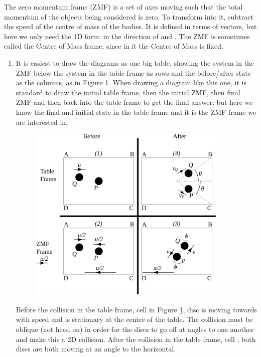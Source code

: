 \begin{problem}
{The zero momentum frame (ZMF) is a set of axes moving such that the total momentum of the objects being considered is zero. To transform into it, subtract the speed of the centre of mass of the bodies. It is defined in terms of vectors, but here we only need the 1D form:   in the direction of  and . The ZMF is sometimes called the Centre of Mass frame, since in it the Centre of Mass is fixed.
}
{}
{\begin{enumerate}
	\item It is easiest to draw the diagrams as one big table, showing the system in the ZMF below the system in the table frame as rows and the before/after state as the columns, as in Figure \ref{fig:Dynamics_ZMF_table_collision}. When drawing a diagram like this one, it is standard to draw the initial table frame, then the initial ZMF, then final ZMF and then back into the table frame to get the final answer; but here we know the final and initial state in the table frame and it is the ZMF frame we are interested in.
\begin{figure}[h]
\centering
\includegraphics[width=0.9\textwidth]{../../../figures/Dynamics_ZMF_table_collision.svg}
\caption{}\label{fig:Dynamics_ZMF_table_collision}
\end{figure}

Before the collision in the table frame, cell  in Figure \ref{fig:Dynamics_ZMF_table_collision}, disc  is moving towards \vari{} with speed  and  is stationary at the centre of the table. The collision must be oblique (not head on) in order for the discs to go off at angles to one another and make this a 2D collision. After the collision in the table frame, cell , both discs are both moving at an angle  to the horizontal.


\end{enumerate}}
\end{problem}
